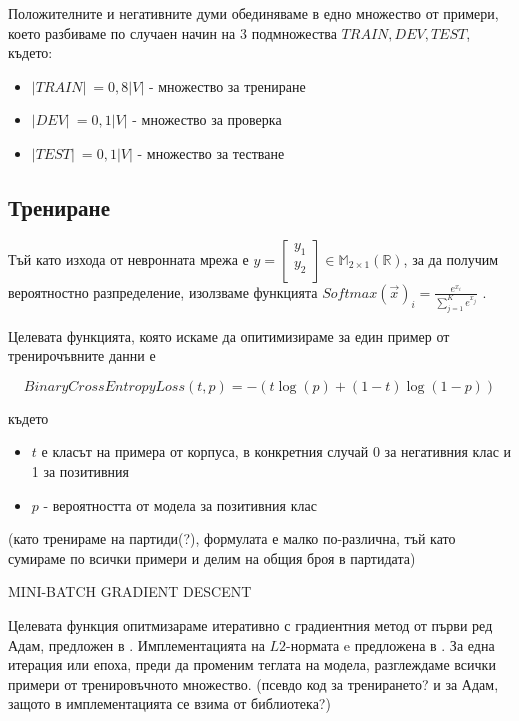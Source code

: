 \documentclass[a4paper,12pt]{article}
\begin{document}
Положителните и негативните думи обединяваме в едно множество от примери, което разбиваме по случаен начин на 3 подмножества $TRAIN, DEV, TEST$, където:
\begin{itemize}
 \item $|TRAIN|\:= 0,8|V|$ - множество за трениране
 \item $|DEV|\:= 0,1|V|$ - множество за проверка
 \item $|TEST|\:= 0,1|V|$ - множество за тестване
\end{itemize}

\subsection{Трениране}

Тъй като изхода от невронната мрежа е $y = \begin{bmatrix}
  y_1 \\ 
  y_2 \\ 
\end{bmatrix} \in \mathbb{M}_{2 \times 1} (\mathbb{R})$, за да получим вероятностно разпределение, изолзваме функцията ${Softmax(\vec{x})}_i = \frac{e^{x_i}}{\sum_{j=1}^{K}e^{x_j}}$ . 

Целевата функцията, която искаме да опитимизираме за един пример от тренирочъвните данни е

\begin{equation} \label{eqn}
BinaryCrossEntropyLoss(t, p) = -(t\log(p) + (1-t)\log(1-p))
\end{equation}

където

\begin{itemize}
 \item $t$ е класът на примера от корпуса, в конкретния случай 0 за негативния клас и 1 за позитивния
 \item $p$ - вероятността от модела за позитивния клас
\end{itemize}

(като тренираме на партиди(?), формулата е малко по-различна, тъй като сумираме по всички примери и делим на общия броя в партидата)

MINI-BATCH GRADIENT DESCENT

Целевата функция опитмизараме итеративно с градиентния метод от първи ред Адам, предложен в \cite{citation07}. Имплементацията на $L2$-нормата e предложена в \cite{citation08}. За една итерация или епоха, преди да променим теглата на модела, разглеждаме всички примери от тренировъчното множество. (псевдо код за тренирането? и за Адам, защото в имплементацията се взима от библиотека?)
\end{document}
